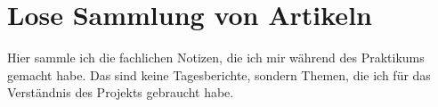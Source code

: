\section{Lose Sammlung von Artikeln}

Hier sammle ich die fachlichen Notizen, die ich mir während des Praktikums gemacht habe. Das sind keine Tagesberichte, sondern Themen, die ich für das Verständnis des Projekts gebraucht habe.










